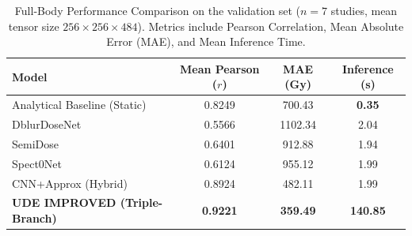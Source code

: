 \documentclass[a4paper,10pt,preprint]{elsarticle}
\begin{document}
\begin{table}[h]
\centering
\caption{Full-Body Performance Comparison on the validation set ($n=7$ studies, mean tensor size $256 \times 256 \times 484$). Metrics include Pearson Correlation, Mean Absolute Error (MAE), and Mean Inference Time.}
\label{tab:dosimetry_comparison}
\begin{tabular}{l c c c}
\toprule
\textbf{Model} & \textbf{Mean Pearson ($r$)} & \textbf{MAE (Gy)} & \textbf{Inference (s)} \\ 
\midrule
Analytical Baseline (Static)          & 0.8249          & 700.43          & \textbf{0.35}   \\
DblurDoseNet                          & 0.5566          & 1102.34         & 2.04            \\
SemiDose                              & 0.6401          & 912.88          & 1.94            \\
Spect0Net                             & 0.6124          & 955.12          & 1.99            \\
CNN+Approx (Hybrid)                   & 0.8924          & 482.11          & 1.99            \\
\textbf{UDE IMPROVED (Triple-Branch)} & \textbf{0.9221} & \textbf{359.49} & \textbf{140.85} \\ 
\bottomrule
\end{tabular}
\end{table}
\end{document}
